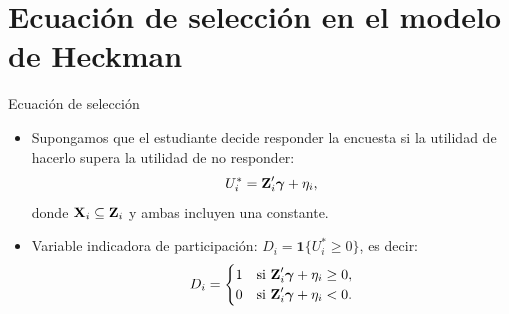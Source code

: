 \documentclass[10pt, xcolor=dvipsnames]{beamer}
\begin{document}
\section{Ecuación de selección en el modelo de Heckman}

\begin{frame}{Ecuación de selección}
\begin{itemize}\setlength{\itemsep}{0.75em}
    \item Supongamos que el estudiante decide responder la encuesta si la utilidad de hacerlo supera la utilidad de no responder:
    \begin{align*}
        U^*_i = \ZB'_i \gammaB + \eta_i, \vspace{-1em}
    \end{align*}
    donde \( \textbf{X}_i \subseteq \textbf{Z}_i \) y ambas incluyen una constante.
    \item Variable indicadora de participación: \( D_i = \mathbf{1}\{U^*_i \geq 0\} \), es decir:
    \begin{align*}
        D_i = 
        \begin{cases}
            1 & \text{si } \textbf{Z}'_i \boldsymbol{\gamma} + \eta_i \geq 0, \\
            0 & \text{si } \textbf{Z}'_i \boldsymbol{\gamma} + \eta_i < 0.
        \end{cases}
    \end{align*}
\end{itemize}
\end{frame}
\end{document}
